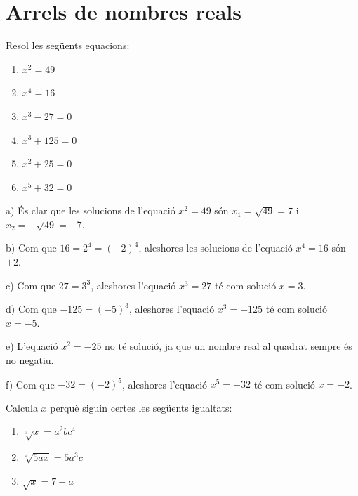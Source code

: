\section{Arrels de nombres reals}

\begin{exercici}
Resol les següents equacions:

\begin{enumerate}
\item[a)] $x^{2}=49$

\item[b)] $x^{4}=16$

\item[c)] $x^{3}-27=0$

\item[d)] $x^{3}+125=0$

\item[e)] $x^{2}+25=0$

\item[f)] $x^{5}+32=0$
\end{enumerate}

\end{exercici}

\begin{solucio}
a) És clar que les solucions de l’equació $x^{2}=49$ són $x_{1}=%
\sqrt{49}=7$ i $x_{2}=-\sqrt{49}=-7$.

b) Com que $16=2^{4}=(-2)^{4}$, aleshores les solucions de l’equació $x^{4}=16$ són $\pm 2$.

c) Com que $27=3^{3}$, aleshores l’equació $x^{3}=27$ té com
solució $x=3$.

d) Com que $-125=(-5)^{3}$, aleshores l’equació $x^{3}=-125$ té
com solució $x=-5$.

e) L’equació $x^{2}=-25$ no té solució, ja que un nombre
real al quadrat sempre és no negatiu.

f) Com que $-32=(-2)^{5}$, aleshores l’equació $x^{5}=-32$ té
com solució $x=-2$.
\end{solucio}

\begin{exercici}
Calcula $x$ perquè siguin certes les següents igualtats:

\begin{enumerate}
\item[a)] $\sqrt[3]{x}=a^{2}bc^{4}$

\item[b)] $\sqrt[4]{5ax}=5a^{3}c$

\item[c)] $\sqrt{x}=7+a$
\end{enumerate}

\end{exercici}

